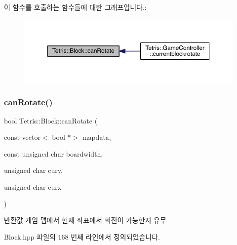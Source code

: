 이 함수를 호출하는 함수들에 대한 그래프입니다.\+:
\nopagebreak
\begin{figure}[H]
\begin{center}
\leavevmode
\includegraphics[width=350pt]{df/d05/class_tetris_1_1_block_a56d194d0a5d56d2d1220ec32774cea38_icgraph}
\end{center}
\end{figure}
\mbox{\label{class_tetris_1_1_block_a56d194d0a5d56d2d1220ec32774cea38}} 
\subsubsection{\texorpdfstring{can\+Rotate()}{canRotate()}\hspace{0.1cm}{\footnotesize\ttfamily [2/2]}}
{\footnotesize\ttfamily bool Tetris\+::\+Block\+::can\+Rotate (\begin{DoxyParamCaption}\item[{const vector$<$ bool $\ast$$>$}]{mapdata,  }\item[{const unsigned char}]{boardwidth,  }\item[{unsigned char}]{cury,  }\item[{unsigned char}]{curx }\end{DoxyParamCaption})\hspace{0.3cm}{\ttfamily [inline]}}

\begin{DoxyReturn}{반환값}
게임 맵에서 현재 좌표에서 회전이 가능한지 유무 
\end{DoxyReturn}


Block.\+hpp 파일의 168 번째 라인에서 정의되었습니다.



